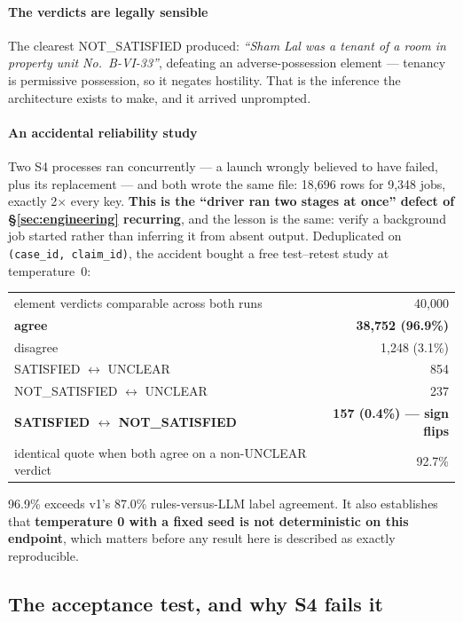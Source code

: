 \documentclass[12pt,a4paper]{article}
\newcommand{\code}[1]{\texttt{\small #1}}
\begin{document}
\paragraph{The verdicts are legally sensible} The clearest NOT\_SATISFIED produced:
\emph{``Sham Lal was a tenant of a room in property unit No.\ B-VI-33''}, defeating an
adverse-possession element --- tenancy is permissive possession, so it negates hostility. That is the
inference the architecture exists to make, and it arrived unprompted.

\paragraph{An accidental reliability study} Two S4 processes ran concurrently --- a launch wrongly
believed to have failed, plus its replacement --- and both wrote the same file: 18,696 rows for 9,348
jobs, exactly 2$\times$ every key. \textbf{This is the ``driver ran two stages at once'' defect of
§\ref{sec:engineering} recurring}, and the lesson is the same: verify a background job started rather
than inferring it from absent output. Deduplicated on \code{(case\_id, claim\_id)}, the accident
bought a free test--retest study at temperature~0:

\begin{center}
\begin{tabular}{@{}lr@{}}
\toprule
element verdicts comparable across both runs & 40,000 \\
\textbf{agree} & \textbf{38,752 (96.9\%)} \\
disagree & 1,248 (3.1\%) \\
\quad SATISFIED $\leftrightarrow$ UNCLEAR & 854 \\
\quad NOT\_SATISFIED $\leftrightarrow$ UNCLEAR & 237 \\
\quad \textbf{SATISFIED $\leftrightarrow$ NOT\_SATISFIED} & \textbf{157 (0.4\%) --- sign flips} \\
identical quote when both agree on a non-UNCLEAR verdict & 92.7\% \\
\bottomrule
\end{tabular}
\end{center}

96.9\% exceeds v1's 87.0\% rules-versus-LLM label agreement. It also establishes that
\textbf{temperature 0 with a fixed seed is not deterministic on this endpoint}, which matters before
any result here is described as exactly reproducible.

\subsection{The acceptance test, and why S4 fails it}\label{sec:s4fail}
\end{document}
